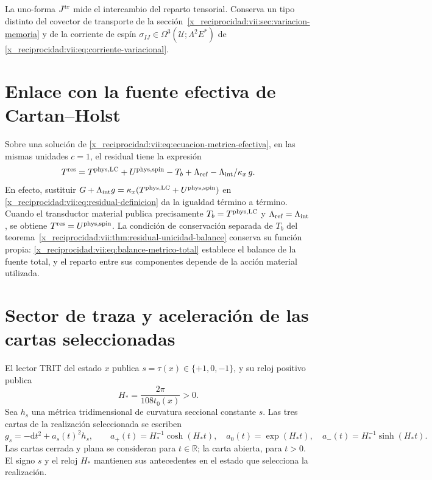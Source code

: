 La uno-forma \(\mathcal J^{\rm tr}\) mide el intercambio del reparto
tensorial. Conserva un tipo distinto del covector de transporte de la
sección~\ref{x_reciprocidad:vii:sec:variacion-memoria} y de la corriente de espín
\(\sigma_{IJ}\in\Omega^3(\mathcal U;\Lambda^2E^*)\) de
\eqref{x_reciprocidad:vii:eq:corriente-variacional}.

\section{Enlace con la fuente efectiva de Cartan--Holst}
\label{x_reciprocidad:vii:subsec:residual-fuente-cartan}

Sobre una solución de \eqref{x_reciprocidad:vii:eq:ecuacion-metrica-efectiva}, en las
mismas unidades \(c=1\), el residual tiene la expresión
\begin{equation}
 T^{\rm res}
 =T^{\rm phys,LC}+U^{\rm phys,spin}-T_b
   +\frac{\Lambda_{\rm ref}-\Lambda_{\rm int}}{\kappa_x}\,g.
 \label{x_reciprocidad:vii:eq:residual-composicion-cartan}
\end{equation}
En efecto, sustituir
\(\mathsf G+\Lambda_{\rm int}g
  =\kappa_x(T^{\rm phys,LC}+U^{\rm phys,spin})\)
en \eqref{x_reciprocidad:vii:eq:residual-definicion} da la igualdad término a término.
Cuando el transductor material publica precisamente
\(T_b=T^{\rm phys,LC}\) y \(\Lambda_{\rm ref}=\Lambda_{\rm int}\),
se obtiene \(T^{\rm res}=U^{\rm phys,spin}\).
La condición de conservación separada de \(T_b\) del
teorema~\ref{x_reciprocidad:vii:thm:residual-unicidad-balance} conserva su función
propia: \eqref{x_reciprocidad:vii:eq:balance-metrico-total} establece el balance de la
fuente total, y el reparto entre sus componentes depende de la acción
material utilizada.

\section{Sector de traza y aceleración de las cartas seleccionadas}
\label{x_reciprocidad:vii:subsec:residual-aceleracion-ds}

El lector TRIT del estado \(x\) publica \(s=\tau(x)\in\{+1,0,-1\}\),
y su reloj positivo publica
\begin{equation}
 H_*=\frac{2\pi}{108t_0(x)}>0.
 \label{x_reciprocidad:vii:eq:reloj-carta-ds}
\end{equation}
Sea \(h_s\) una métrica tridimensional de curvatura seccional constante
\(s\). Las tres cartas de la realización seleccionada se escriben
\begin{equation}
 g_s=-\mathrm dt^2+a_s(t)^2h_s,\qquad
 a_+(t)=H_*^{-1}\cosh(H_*t),\quad
 a_0(t)=\exp(H_*t),\quad
 a_-(t)=H_*^{-1}\sinh(H_*t).
 \label{x_reciprocidad:vii:eq:cartas-ds-residual}
\end{equation}
Las cartas cerrada y plana se consideran para \(t\in\mathbb R\);
la carta abierta, para \(t>0\). El signo \(s\) y el reloj \(H_*\)
mantienen sus antecedentes en el estado que selecciona la realización.

